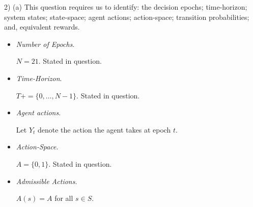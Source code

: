 \documentclass[11pt,a4paper]{article}
\begin{document}
\begin{answer}{2) (a)}
  This question requires us to identify: the decision epochs; time-horizon; system states; state-space; agent actions; action-space; transition probabilities; and, equivalent rewards.
  \begin{itemize}
    \item \textit{Number of Epochs}.
    \par $N=21$. Stated in question.

    \item \textit{Time-Horizon}.
    \par $T+
    =\{0,\dots,N-1\}$. Stated in question.

    \item \textit{Agent actions}.
    \par Let $Y_t$ denote the action the agent takes at epoch $t$.

    \item \textit{Action-Space}.
    \par $A=\{0,1\}$. Stated in question.

    \item \textit{Admissible Actions}.
    \par $A(s)=A$ for all $s\in S$.


\end{itemize}
\end{answer}
\end{document}
